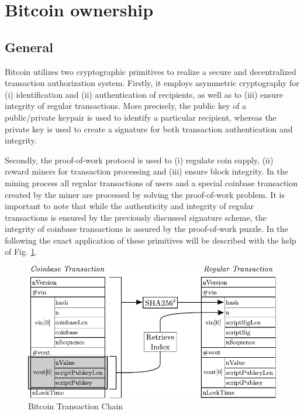 \section{Bitcoin ownership} \label{sec:BitcoinOwnership}

\subsection{General} \label{sec:OwnershipGeneral}
Bitcoin utilizes two cryptographic primitives to realize a secure and decentralized transaction authorization system. Firstly, it employs asymmetric cryptography for (i) identification and (ii) authentication of recipients, as well as to (iii) ensure integrity of regular transactions. More precisely, the public key of a public/private keypair is used to identify a particular recipient, whereas the private key is used to create a signature for both transaction authentication and integrity.

Secondly, the proof-of-work protocol is used to (i) regulate coin supply, (ii) reward miners for transaction processing and (iii) ensure block integrity. In the mining process all regular transactions of users and a special coinbase transaction created by the miner are processed by solving the proof-of-work problem. It is important to note that while the authenticity and integrity of regular transactions is ensured by the previously discussed signature scheme, the integrity of coinbase transactions is assured by the proof-of-work puzzle. In the following the exact application of these primitives will be described with the help of Fig. \ref{fig:TransactionChain}.

\vspace{-10pt}
\begin{figure}[htbp]
\centering
\includegraphics[scale=0.9]{images/Ownership.pdf}

\caption{Bitcoin Transaction Chain}
\label{fig:TransactionChain}
\end{figure}
\vspace{-10pt}

